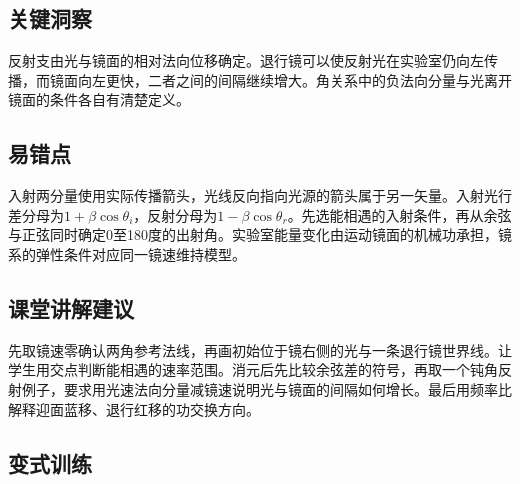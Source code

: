 \documentclass[UTF8,fontset=fandol,a4paper,11pt]{ctexart}
\begin{document}

\subsection*{关键洞察}

反射支由光与镜面的相对法向位移确定。退行镜可以使反射光在实验室仍向左传播，而镜面向左更快，二者之间的间隔继续增大。角关系中的负法向分量与光离开镜面的条件各自有清楚定义。



\subsection*{易错点}

入射两分量使用实际传播箭头，光线反向指向光源的箭头属于另一矢量。入射光行差分母为$1+\beta\cos\theta_i$，反射分母为$1-\beta\cos\theta_r$。先选能相遇的入射条件，再从余弦与正弦同时确定0至180度的出射角。实验室能量变化由运动镜面的机械功承担，镜系的弹性条件对应同一镜速维持模型。



\subsection*{课堂讲解建议}

先取镜速零确认两角参考法线，再画初始位于镜右侧的光与一条退行镜世界线。让学生用交点判断能相遇的速率范围。消元后先比较余弦差的符号，再取一个钝角反射例子，要求用光速法向分量减镜速说明光与镜面的间隔如何增长。最后用频率比解释迎面蓝移、退行红移的功交换方向。



\subsection*{变式训练}
\end{document}
